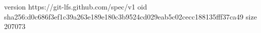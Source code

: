 version https://git-lfs.github.com/spec/v1
oid sha256:d0c686f3ef1c39a263e189e180c3b9524cd029eab5c02cecc188135fff37ca49
size 207073

